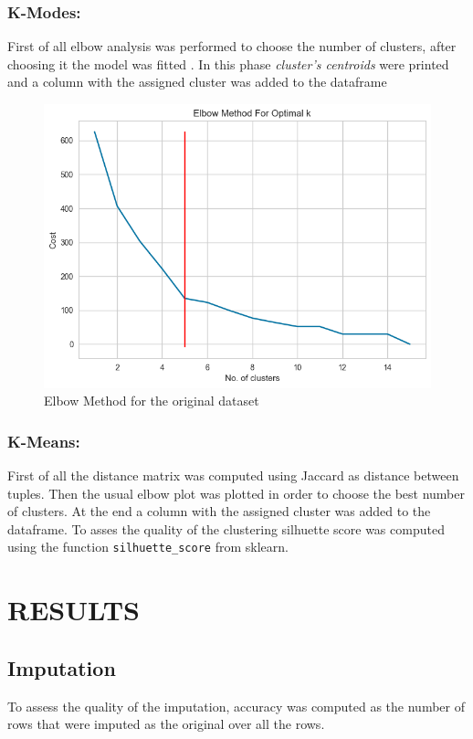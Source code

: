 \documentclass{article}
\begin{document}
\subsubsection{K-Modes:} First of all elbow analysis was performed to choose the number of clusters, after choosing it the model was fitted . In this phase \emph{cluster's centroids} were printed and a column with the assigned cluster was added to the dataframe
\begin{figure}[h]\centering
	\includegraphics[scale=0.4]{img/elbow.png}
	\caption{Elbow Method for the original dataset}
\end{figure}
			
\subsubsection{K-Means:} First of all the distance matrix was computed using Jaccard as distance between tuples. Then the usual elbow plot was plotted in order to choose the best number of clusters. At the end a column with the assigned cluster was added to the dataframe.  To asses the quality of the clustering silhuette score was computed using the function \texttt{silhuette\_score} from sklearn.
\newpage
\section{RESULTS}

\subsection{Imputation}
To assess the quality of the imputation, accuracy was computed as the number of rows that were imputed as the original over all the rows.
\end{document}
